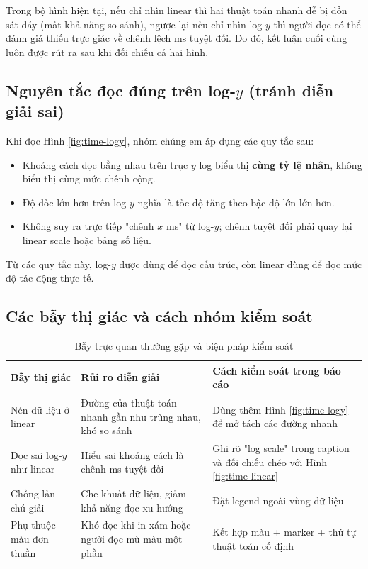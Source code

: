 Trong bộ hình hiện tại, nếu chỉ nhìn linear thì hai thuật toán nhanh dễ bị dồn sát đáy (mất khả năng so sánh),
ngược lại nếu chỉ nhìn log-$y$ thì người đọc có thể đánh giá thiếu trực giác về chênh lệch ms tuyệt đối.
Do đó, kết luận cuối cùng luôn được rút ra sau khi đối chiếu cả hai hình.

\subsection{Nguyên tắc đọc đúng trên log-$y$ (tránh diễn giải sai)}

Khi đọc Hình \ref{fig:time-logy}, nhóm chúng em áp dụng các quy tắc sau:
\begin{itemize}[leftmargin=1.2cm]
    \item Khoảng cách dọc bằng nhau trên trục $y$ log biểu thị \textbf{cùng tỷ lệ nhân}, không biểu thị cùng mức chênh cộng.
    \item Độ dốc lớn hơn trên log-$y$ nghĩa là tốc độ tăng theo bậc độ lớn lớn hơn.
    \item Không suy ra trực tiếp "chênh $x$ ms" từ log-$y$; chênh tuyệt đối phải quay lại linear scale hoặc bảng số liệu.
\end{itemize}

Từ các quy tắc này, log-$y$ được dùng để đọc cấu trúc, còn linear dùng để đọc mức độ tác động thực tế.

\subsection{Các bẫy thị giác và cách nhóm kiểm soát}

\begin{table}[H]
\centering
\renewcommand{\arraystretch}{1.2}
\begin{tabular}{p{4.0cm}p{4.8cm}p{4.2cm}}
\toprule
\textbf{Bẫy thị giác} & \textbf{Rủi ro diễn giải} & \textbf{Cách kiểm soát trong báo cáo} \\
\midrule
Nén dữ liệu ở linear & Đường của thuật toán nhanh gần như trùng nhau, khó so sánh & Dùng thêm Hình \ref{fig:time-logy} để mở tách các đường nhanh \\
Đọc sai log-$y$ như linear & Hiểu sai khoảng cách là chênh ms tuyệt đối & Ghi rõ "log scale" trong caption và đối chiếu chéo với Hình \ref{fig:time-linear} \\
Chồng lấn chú giải & Che khuất dữ liệu, giảm khả năng đọc xu hướng & Đặt legend ngoài vùng dữ liệu \\
Phụ thuộc màu đơn thuần & Khó đọc khi in xám hoặc người đọc mù màu một phần & Kết hợp màu + marker + thứ tự thuật toán cố định \\
\bottomrule
\end{tabular}
\caption{Bẫy trực quan thường gặp và biện pháp kiểm soát}
\label{tab:viz-pitfalls}
\end{table}

